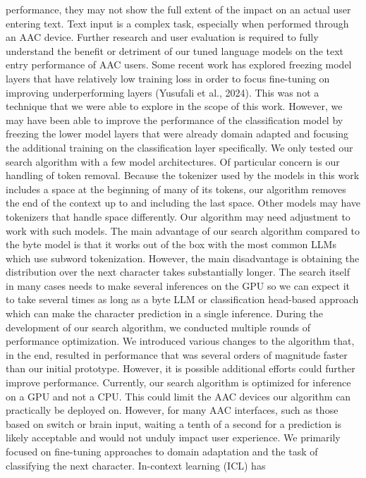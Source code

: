 performance, they may not show the full extent of
the impact on an actual user entering text. Text
input is a complex task, especially when performed
through an AAC device. Further research and user
evaluation is required to fully understand the benefit or detriment of our tuned language models on
the text entry performance of AAC users.
Some recent work has explored freezing model
layers that have relatively low training loss in order
to focus fine-tuning on improving underperforming layers (Yusufali et al., 2024). This was not a
technique that we were able to explore in the scope
of this work. However, we may have been able
to improve the performance of the classification
model by freezing the lower model layers that were
already domain adapted and focusing the additional
training on the classification layer specifically.
We only tested our search algorithm with a few
model architectures. Of particular concern is our
handling of token removal. Because the tokenizer
used by the models in this work includes a space at
the beginning of many of its tokens, our algorithm
removes the end of the context up to and including
the last space. Other models may have tokenizers
that handle space differently. Our algorithm may
need adjustment to work with such models.
The main advantage of our search algorithm
compared to the byte model is that it works out
of the box with the most common LLMs which use
subword tokenization. However, the main disadvantage is obtaining the distribution over the next
character takes substantially longer. The search
itself in many cases needs to make several inferences on the GPU so we can expect it to take several times as long as a byte LLM or classification
head-based approach which can make the character
prediction in a single inference. During the development of our search algorithm, we conducted
multiple rounds of performance optimization. We
introduced various changes to the algorithm that, in
the end, resulted in performance that was several orders of magnitude faster than our initial prototype.
However, it is possible additional efforts could further improve performance.
Currently, our search algorithm is optimized for
inference on a GPU and not a CPU. This could
limit the AAC devices our algorithm can practically be deployed on. However, for many AAC
interfaces, such as those based on switch or brain
input, waiting a tenth of a second for a prediction
is likely acceptable and would not unduly impact
user experience.
We primarily focused on fine-tuning approaches
to domain adaptation and the task of classifying
the next character. In-context learning (ICL) has
